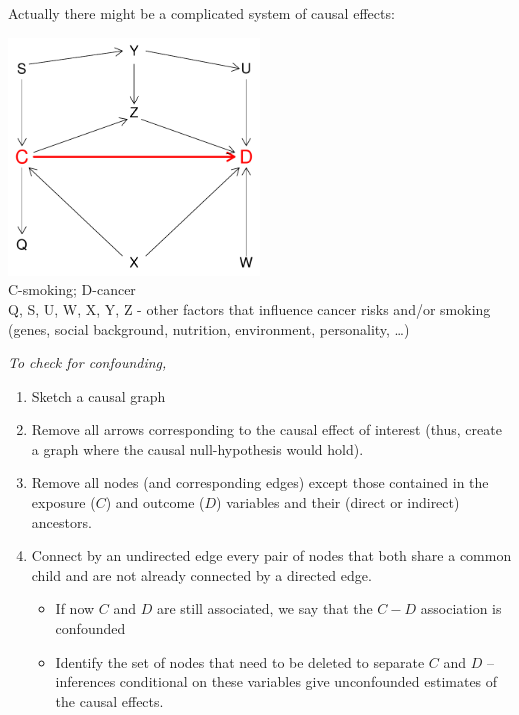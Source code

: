 \documentclass[xcolor=svgnames,handout]{beamer}
\begin{document}



\begin{frame}
 Actually there might be a complicated system of
causal effects:

{\includegraphics[width=0.5\textwidth]{keeruline2}}\\
{\small  C-smoking; D-cancer \\
Q, S, U, W, X, Y, Z - other factors that influence cancer risks
and/or smoking (genes, social background, nutrition, environment,
personality, \ldots)}
\end{frame}

\begin{frame}
 \emph{To check for confounding,}

\begin{enumerate}
\item Sketch a causal graph
\item
 Remove all arrows corresponding to the causal effect of interest
 (thus, create a graph where the causal null-hypothesis would hold).
 \item Remove all nodes (and corresponding edges) except
 those contained in the exposure ($C$) and outcome ($D$) variables and their (direct or indirect)
ancestors. 
\item
Connect by an undirected edge every pair of nodes that both
share a common child and are not already connected by a
directed edge. 
\begin{itemize}
\item If now $C$ and $D$ are still associated, we say that the $C-D$
association is confounded  
\item Identify the set of nodes that need to be deleted to separate $C$ and $D$ --  inferences conditional
on these variables give unconfounded estimates of the causal effects.
\end{itemize}
\end{enumerate}
\end{frame}
\end{document}
